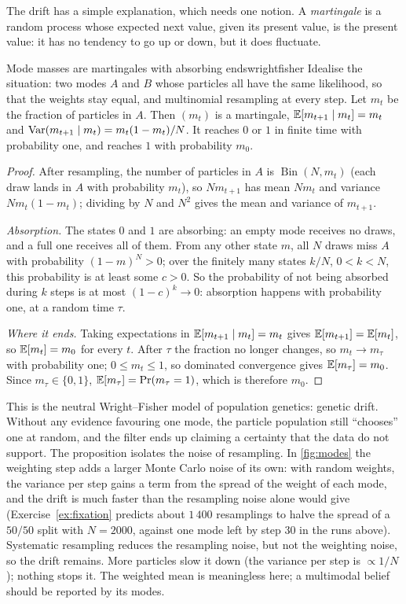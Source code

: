 The drift has a simple explanation, which needs one notion. A
\emph{martingale} is a random process whose expected next value, given its
present value, is the present value: it has no tendency to go up or down,
but it does fluctuate.

\begin{proposition}{Mode masses are martingales with absorbing ends}{wrightfisher}
Idealise the situation: two modes $A$ and $B$ whose particles all have
the same likelihood, so that the weights stay equal, and multinomial
resampling at every step. Let
$m_t$ be the fraction of particles in $A$. Then $(m_t)$ is a martingale,
$\mathbb{E}[m_{t+1}\mid m_t]=m_t$ and $\operatorname{Var}(m_{t+1}\mid m_t)=m_t(1-m_t)/N$. It
reaches $0$ or $1$ in finite time with probability one, and reaches $1$
with probability $m_0$.
\end{proposition}

\begin{proof}
After resampling, the number of particles in $A$ is
$\operatorname{Bin}(N,m_t)$ (each draw lands in $A$ with probability
$m_t$), so $Nm_{t+1}$ has mean $Nm_t$ and variance $Nm_t(1-m_t)$;
dividing by $N$ and $N^2$ gives the mean and variance of $m_{t+1}$.

\emph{Absorption.} The states $0$ and $1$ are absorbing: an empty mode
receives no draws, and a full one receives all of them. From any other
state $m$, all $N$ draws miss $A$ with probability $(1-m)^N>0$; over the
finitely many states $k/N$, $0<k<N$, this probability is at least some
$c>0$. So the probability of not being absorbed during $k$ steps is at
most $(1-c)^k\to0$: absorption happens with probability one, at a random
time $\tau$.

\emph{Where it ends.} Taking expectations in $\mathbb{E}[m_{t+1}\mid m_t]=m_t$
gives $\mathbb{E}[m_{t+1}]=\mathbb{E}[m_t]$, so $\mathbb{E}[m_t]=m_0$ for every $t$. After $\tau$
the fraction no longer changes, so $m_t\to m_\tau$ with probability one;
$0\le m_t\le1$, so dominated convergence gives $\mathbb{E}[m_\tau]=m_0$. Since
$m_\tau\in\{0,1\}$, $\mathbb{E}[m_\tau]=\Pr(m_\tau=1)$, which is therefore $m_0$.
\end{proof}

\begin{inwords}
This is the neutral Wright--Fisher model of population genetics: genetic
drift. Without any evidence favouring one mode, the particle population
still ``chooses'' one at random, and the filter ends up claiming a
certainty that the data do not support. The proposition isolates the
noise of resampling. In \cref{fig:modes} the weighting step adds a
larger Monte Carlo noise of its own: with random weights, the variance
per step gains a term from the spread of the weight of each mode, and the
drift is much faster than the resampling noise alone would give
(Exercise~\ref{ex:fixation} predicts about $1\,400$ resamplings to halve
the spread of a $50/50$ split with $N=2000$, against one mode left by step
30 in the runs above). Systematic resampling reduces the resampling noise,
but not the weighting noise, so the drift remains. More particles slow it down
(the variance per step is $\propto1/N$); nothing stops it. The weighted
mean is meaningless here; a multimodal belief should be reported by its
modes.
\end{inwords}

